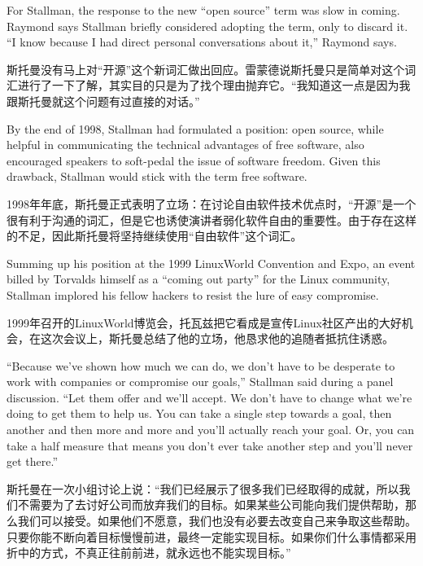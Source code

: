 \ifdefined\eng
For Stallman, the response to the new ``open source'' term was slow in coming. Raymond says Stallman briefly considered adopting the term, only to discard it. ``I know because I had direct personal conversations about it,'' Raymond says.
\fi

\ifdefined\chs
斯托曼没有马上对``开源''这个新词汇做出回应。雷蒙德说斯托曼只是简单对这个词汇进行了一下了解，其实目的只是为了找个理由抛弃它。``我知道这一点是因为我跟斯托曼就这个问题有过直接的对话。''
\fi

\ifdefined\eng
By the end of 1998, Stallman had formulated a position: open source, while helpful in communicating the technical advantages of free software, also encouraged speakers to soft-pedal the issue of software freedom. Given this drawback, Stallman would stick with the term free software.
\fi

\ifdefined\chs
1998年年底，斯托曼正式表明了立场：在讨论自由软件技术优点时，``开源''是一个很有利于沟通的词汇，但是它也诱使演讲者弱化软件自由的重要性。由于存在这样的不足，因此斯托曼将坚持继续使用``自由软件''这个词汇。
\fi

\ifdefined\eng
Summing up his position at the 1999 LinuxWorld Convention and Expo, an event billed by Torvalds himself as a ``coming out party'' for the Linux community, Stallman implored his fellow hackers to resist the lure of easy compromise.
\fi

\ifdefined\chs
1999年召开的LinuxWorld博览会，托瓦兹把它看成是宣传Linux社区产出的大好机会，在这次会议上，斯托曼总结了他的立场，他恳求他的追随者抵抗住诱惑。
\fi

\ifdefined\eng
``Because we've shown how much we can do, we don't have to be desperate to work with companies or compromise our goals,'' Stallman said during a panel discussion. ``Let them offer and we'll accept. We don't have to change what we're doing to get them to help us. You can take a single step towards a goal, then another and then more and more and you'll actually reach your goal. Or, you can take a half measure that means you don't ever take another step and you'll never get there.''
\fi

\ifdefined\chs
斯托曼在一次小组讨论上说：``我们已经展示了很多我们已经取得的成就，所以我们不需要为了去讨好公司而放弃我们的目标。如果某些公司能向我们提供帮助，那么我们可以接受。如果他们不愿意，我们也没有必要去改变自己来争取这些帮助。只要你能不断向着目标慢慢前进，最终一定能实现目标。如果你们什么事情都采用折中的方式，不真正往前前进，就永远也不能实现目标。''
\fi

